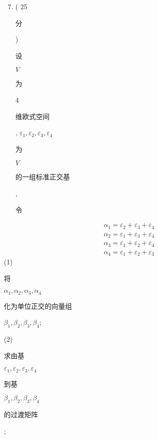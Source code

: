 \documentclass[10pt]{article}
\begin{document}
\begin{enumerate}
  \setcounter{enumi}{6}
  \item ( 25 \begin{CJK}{UTF8}{mj}分\end{CJK}) \begin{CJK}{UTF8}{mj}设\end{CJK} $V$ \begin{CJK}{UTF8}{mj}为\end{CJK} 4 \begin{CJK}{UTF8}{mj}维欧式空间\end{CJK}, $\varepsilon_{1}, \varepsilon_{2}, \varepsilon_{3}, \varepsilon_{4}$ \begin{CJK}{UTF8}{mj}为\end{CJK} $V$ \begin{CJK}{UTF8}{mj}的一组标准正交基\end{CJK}, \begin{CJK}{UTF8}{mj}令\end{CJK}
\end{enumerate}
$$
\begin{aligned}
&\alpha_{1}=\varepsilon_{2}+\varepsilon_{3}+\varepsilon_{4} \\
&\alpha_{2}=\varepsilon_{1}+\varepsilon_{3}+\varepsilon_{4} \\
&\alpha_{3}=\varepsilon_{1}+\varepsilon_{2}+\varepsilon_{4} \\
&\alpha_{4}=\varepsilon_{1}+\varepsilon_{2}+\varepsilon_{3}
\end{aligned}
$$
(1) \begin{CJK}{UTF8}{mj}将\end{CJK} $\alpha_{1}, \alpha_{2}, \alpha_{3}, \alpha_{4}$ \begin{CJK}{UTF8}{mj}化为单位正交的向量组\end{CJK} $\beta_{1}, \beta_{2}, \beta_{3}, \beta_{4}$;

(2) \begin{CJK}{UTF8}{mj}求由基\end{CJK} $\varepsilon_{1}, \varepsilon_{2}, \varepsilon_{3}, \varepsilon_{4}$ \begin{CJK}{UTF8}{mj}到基\end{CJK} $\beta_{1}, \beta_{2}, \beta_{3}, \beta_{4}$ \begin{CJK}{UTF8}{mj}的过渡矩阵\end{CJK};
\end{document}
